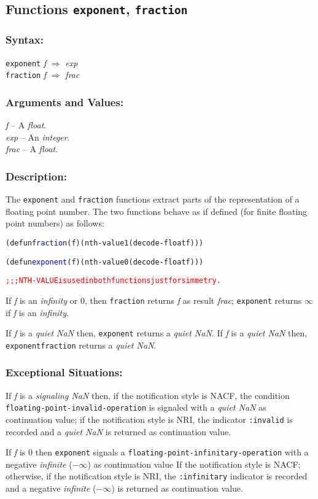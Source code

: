 \documentclass[10pt,fleqn]{article}
\newcommand{\code}[1]{\texttt{#1}}
\newcommand{\clliaterm}[1]{\textit{#1}}
\newcommand{\varname}[1]{\textit{#1}}
\newcommand{\clterm}[1]{\textit{#1}}
\newcommand{\codelia}[1]{\textcolor{blue}{#1}}
\newcommand{\RArrow}{$\Rightarrow$}
\newcommand{\DDictionaryItem}[1]{\vspace*{6pt}\noindent\hrulefill\vspace*{-9pt}\subsection*{#1}}
\newcommand{\DSyntax}{\subsubsection*{Syntax:}}
\newcommand{\DArgsNValues}{\subsubsection*{Arguments and Values:}}
\newcommand{\DDescription}{\subsubsection*{Description:}}
\newcommand{\DExceptional}{\subsubsection*{Exceptional Situations:}}
\begin{document}
\DDictionaryItem{Functions \code{exponent}, \code{fraction}}
\index{E!\code{exponent}}
\index{F!\code{fraction}}

\DSyntax{}

\code{exponent} \varname{f} \RArrow{} \varname{exp}\\
\code{fraction} \varname{f} \RArrow{} \varname{frac}\\


\DArgsNValues{}

\varname{f} -- A \clterm{float}.\\
\varname{exp} -- An \clterm{integer}.\\
\varname{frac} -- A \clterm{float}.

\DDescription{}

The \code{exponent} and \code{fraction} functions extract parts of the
representation of a floating point number.  The two functions behave
as if defined (for finite floating point numbers) as follows:

\begin{alltt}
  (defun \codelia{fraction} (f) (nth-value 1 (decode-float f)))
  
  (defun \codelia{exponent} (f) (nth-value 0 (decode-float f)))
  
  \textcolor{red}{;;; NTH-VALUE is used in both functions just for simmetry.}
\end{alltt}

If \varname{f} is an \clliaterm{infinity} or $0$, then \code{fraction}
returns \varname{f} as result \varname{frac}; \code{exponent}
returns $\infty$ if \varname{f} is an \clliaterm{infinity}.

If \varname{f} is a \clliaterm{quiet NaN} then, \code{exponent}
returns a \clliaterm{quiet NaN}.  If \varname{f} is a \clliaterm{quiet
  NaN} then, \code{exponentfraction} returns a \clliaterm{quiet NaN}.

\DExceptional{}

If \varname{f} is a \clliaterm{signaling NaN} then, if the notification
style is NACF, the condition\\
\code{floating-point-invalid-operation} is signaled with a
\clliaterm{quiet NaN} as continuation value; if the notification style
is NRI, the indicator \code{:invalid} is recorded and a
\clliaterm{quiet NaN} is returned as continuation value.

If \varname{f} is $0$ then \code{exponent} signals a
\code{floating-point-infinitary-operation} with a negative
\clliaterm{infinite} ($-\infty$) as continuation value If the
notification style is NACF; otherwise, if the notification style is
NRI, the \code{:infinitary} indicator is recorded and a negative
\clliaterm{infinite} ($-\infty$) is returned as continuation value.
\end{document}
